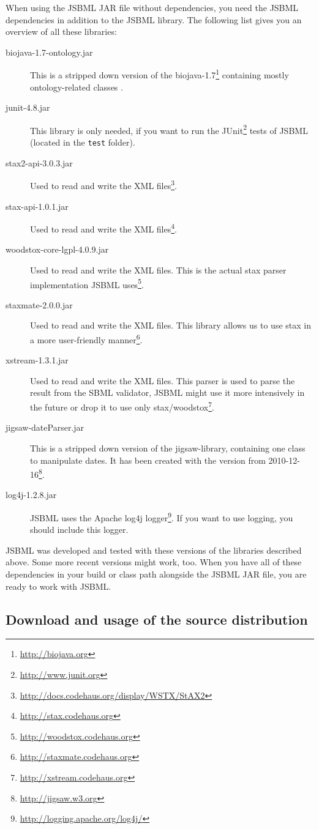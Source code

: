 When using the JSBML JAR file without dependencies, you need the JSBML
dependencies in addition to the JSBML library. The following list gives you an
overview of all these libraries:
\begin{description}
\item[biojava-1.7-ontology.jar] This is a stripped down version of the
biojava-1.7\footnote{\url{http://biojava.org}} containing mostly
ontology-related classes \citep{Holland2008}.
\item[junit-4.8.jar] This library is only needed, if you want to run the
JUnit\footnote{\url{http://www.junit.org}\label{fn:junit}} tests of JSBML
(located in the \texttt{test} folder).
\item[stax2-api-3.0.3.jar] Used to read and write the XML
files\footnote{\url{http://docs.codehaus.org/display/WSTX/StAX2}}.
\item[stax-api-1.0.1.jar] Used to read and write the XML
files\footnote{\url{http://stax.codehaus.org}}.
\item[woodstox-core-lgpl-4.0.9.jar] Used to read and write the XML files. This
is the actual stax parser implementation JSBML
uses\footnote{\url{http://woodstox.codehaus.org}}.
\item[staxmate-2.0.0.jar] Used to read and write the XML files. This library
allows us to use stax in a more user-friendly
manner\footnote{\url{http://staxmate.codehaus.org}}.
\item[xstream-1.3.1.jar] Used to read and write the XML files. This parser is
used to parse the result from the SBML validator, JSBML might use it more
intensively in the future or drop it to use only
stax/woodstox\footnote{\url{http://xstream.codehaus.org}}.
\item[jigsaw-dateParser.jar] This is a stripped down version of the
jigsaw-library, containing one class to manipulate dates. It has been created
with the version from 2010-12-16\footnote{\url{http://jigsaw.w3.org}}.
\item[log4j-1.2.8.jar] JSBML uses the Apache log4j
logger\footnote{\url{http://logging.apache.org/log4j/}}. If you want to use
logging, you should include this logger.
\end{description}
JSBML was developed and tested with these versions of the libraries described
above. Some more recent versions might work, too. When you have all of these
dependencies in your build or class path alongside the JSBML JAR file, you are
ready to work with JSBML.


\subsection{Download and usage of the source distribution}

